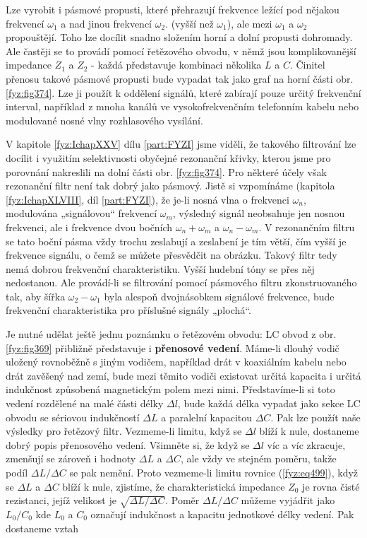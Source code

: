 {  Lze vyrobit i pásmové propusti, které přehrazují frekvence ležící pod nějakou frekvencí 
  \(\omega_1\) a nad jinou frekvencí \(\omega_2\). (vyšší než \(\omega_1\)), ale mezi \(\omega_1\) 
  a \(\omega_2\) propouštějí. Toho lze docílit snadno složením horní a dolní propusti dohromady. 
  Ale častěji se to provádí pomocí řetězového obvodu, v němž jsou komplikovanější impedance \(Z_1\) 
  a \(Z_2\) - každá představuje kombinaci několika \(L\) a \(C\). Činitel přenosu takové pásmové 
  propusti bude vypadat tak jako graf na horní části obr. \ref{fyz:fig374}. Lze ji použít k 
  oddělení signálů, které zabírají pouze určitý frekvenční interval, například z mnoha kanálů ve 
  vysokofrekvenčním telefonním kabelu nebo modulované nosné vlny rozhlasového vysílání. 
  
  V kapitole \ref{fyz:IchapXXV} dílu \ref{part:FYZI} jsme viděli, že takového filtrování lze 
  docílit i využitím selektivnosti obyčejné rezonanční křivky, kterou jsme pro porovnání nakreslili 
  na dolní části obr. \ref{fyz:fig374}. Pro některé účely však rezonanční filtr není tak dobrý jako 
  pásmový. Jistě si vzpomínáme (kapitola \ref{fyz:IchapXLVIII}, díl \ref{part:FYZI}), že je-li 
  nosná vlna o frekvenci \(\omega_n\), modulována „signálovou“ frekvencí \(\omega_m\), výsledný 
  signál neobsahuje jen nosnou frekvenci, ale i frekvence dvou bočních \(\omega_n+\omega_m\) a 
  \(\omega_n-\omega_m\). V rezonančním filtru se tato boční pásma vždy trochu zeslabují a zeslabení 
  je tím větší, čím vyšší je frekvence signálu, o čemž se můžete přesvědčit na obrázku. Takový 
  filtr tedy nemá dobrou frekvenční charakteristiku. Vyšší hudební tóny se přes něj nedostanou. Ale 
  provádí-li se filtrování pomocí pásmového filtru zkonstruovaného tak, aby šířka 
  \(\omega_2-\omega_1\) byla alespoň dvojnásobkem signálové frekvence, bude frekvenční 
  charakteristika pro příslušné signály „plochá“. 
  
  Je nutné udělat ještě jednu poznámku o řetězovém obvodu: LC obvod z obr. \ref{fyz:fig369} 
  přibližně představuje i \textbf{přenosové vedení}. Máme-li dlouhý vodič uložený rovnoběžně s 
  jiným vodičem, například drát v koaxiálním kabelu nebo drát zavěšený nad zemí, bude mezi těmito 
  vodiči existovat určitá kapacita i určitá indukčnost způsobená magnetickým polem mezi nimi. 
  Představíme-li si toto vedení rozdělené na malé části délky \(\Delta l\), bude každá délka 
  vypadat jako sekce LC obvodu se sériovou indukčností \(\Delta L\) a paralelní kapacitou \(\Delta 
  C\). Pak lze použít naše výsledky pro řetězový filtr. Vezmeme-li limitu, když se \(\Delta l\) 
  blíží k nule, dostaneme dobrý popis přenosového vedení. Všimněte si, že když se \(\Delta l\) víc 
  a víc zkracuje, zmenšují se zároveň i hodnoty \(\Delta L\) a \(\Delta C\), ale vždy ve stejném 
  poměru, takže podíl \(\Delta L/\Delta C\) se pak nemění. Proto vezmeme-li limitu rovnice 
  (\ref{fyz:eq499}), když se \(\Delta L\) a \(\Delta C\) blíží k nule, zjistíme, že 
  charakteristická impedance \(Z_0\) je rovna čisté rezistanci, jejíž velikost je \(\sqrt{\Delta 
  L/\Delta C}\). Poměr \(\Delta L/\Delta C\) můžeme vyjádřit jako \(L_0/C_0\) kde \(L_0\) a \(C_0\) 
  označují indukčnost a kapacitu jednotkové délky vedení. Pak dostaneme vztah
  
}
